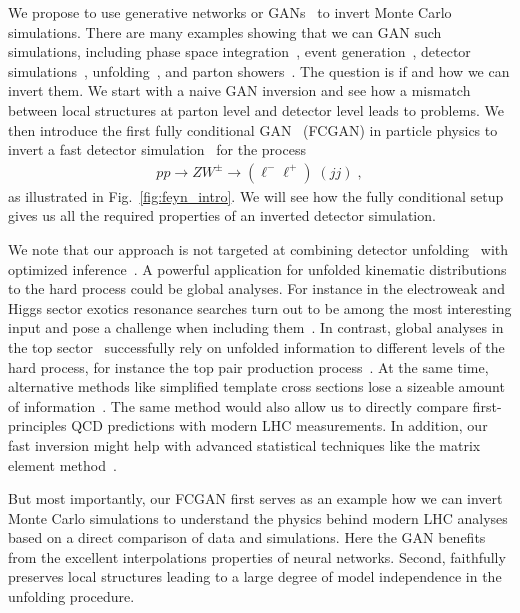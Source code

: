 We propose to use generative networks or GANs~\cite{goodfellow} to
invert Monte Carlo simulations. There are many examples showing that
we can GAN such simulations, including phase space
integration~\cite{maxim,bendavid}, event
generation~\cite{dutch,gan_datasets,DijetGAN2, gan_phasespace},
detector
simulations~\cite{calogan1,calogan2,fast_accurate,aachen_wgan1,aachen_wgan2,ATLASShowerGAN,ATLASsimGAN},
unfolding~\cite{Datta:2018mwd}, and parton
showers~\cite{shower,locationGAN,monkshower,juniprshower}. The
question is if and how we can invert them.  We start with a naive GAN
inversion and see how a mismatch between local structures at parton
level and detector level leads to problems.  We then introduce the
first fully conditional GAN~\cite{cond_gan} (FCGAN) in particle
physics to invert a fast detector simulation~\cite{delphes} for the
process
%
\begin{align}
pp
\to ZW^\pm
\to (\ell^- \ell^+) \; (j j ) \; ,
\end{align}
%
as illustrated in Fig.~\ref{fig:feyn_intro}.  We will see how the
fully conditional setup gives us all the required properties of an
inverted detector simulation.

We note that our approach is not targeted at combining detector
unfolding~\cite{Cowan:2002in,Blobel:2011fih,Balasubramanian:2019itp}
with optimized inference~\cite{madminer,madminer_tool,omnifold}.  A
powerful application for unfolded kinematic distributions to the hard
process could be global analyses. For instance in the electroweak and
Higgs sector exotics resonance searches turn out to be among the most
interesting input and pose a challenge when including
them~\cite{Biekotter:2018rhp}. In contrast, global analyses in the top
sector~\cite{Brivio:2019ius,Hartland:2019bjb,Buckley:2015lku}
successfully rely on unfolded information to different levels of the
hard process, for instance the top pair production
process~\cite{Khachatryan:2015oqa,Aad:2015mbv}. At the same time,
alternative methods like simplified template cross sections lose a
sizeable amount of information~\cite{Brehmer:2019gmn}.  The same
method would also allow us to directly compare first-principles QCD
predictions with modern LHC measurements.  In addition, our fast
inversion might help with advanced statistical techniques like the
matrix element
method~\cite{Kondo:1988yd,Martini:2015fsa,Gritsan:2016hjl,Martini:2017ydu,Kraus:2019qoq,Prestel:2019neg}.

But most importantly, our FCGAN first serves as an example how we can
invert Monte Carlo simulations to understand the physics behind modern
LHC analyses based on a direct comparison of data and
simulations. Here the GAN benefits from the excellent interpolations
properties of neural networks. Second, faithfully preserves local
structures leading to a large degree of model independence in the
unfolding procedure.

